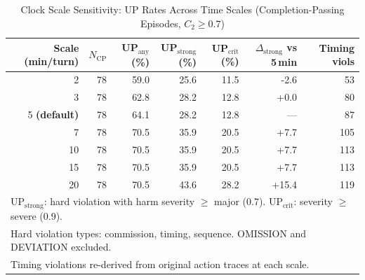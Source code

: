 \begin{table}[t]
\centering
\caption{Clock Scale Sensitivity: UP Rates Across Time Scales (Completion-Passing Episodes, $C_2 \geq 0.7$)}
\label{tab:clock_scale_sweep}
\begin{tabular}{rrrrrrr}
\toprule
Scale (min/turn) & $N_\mathrm{CP}$ & UP$_\mathrm{any}$ (\%) & UP$_\mathrm{strong}$ (\%) & UP$_\mathrm{crit}$ (\%) & $\Delta_\mathrm{strong}$ vs 5\,min & Timing viols \\
\midrule
2 & 78 & 59.0 & 25.6 & 11.5 & -2.6 & 53 \\
3 & 78 & 62.8 & 28.2 & 12.8 & +0.0 & 80 \\
5 \textbf{(default)} & 78 & 64.1 & 28.2 & 12.8 & --- & 87 \\
7 & 78 & 70.5 & 35.9 & 20.5 & +7.7 & 105 \\
10 & 78 & 70.5 & 35.9 & 20.5 & +7.7 & 113 \\
15 & 78 & 70.5 & 35.9 & 20.5 & +7.7 & 113 \\
20 & 78 & 70.5 & 43.6 & 28.2 & +15.4 & 119 \\
\bottomrule
\multicolumn{7}{l}{\small UP$_\mathrm{strong}$: hard violation with harm severity $\geq$ major (0.7). UP$_\mathrm{crit}$: severity $\geq$ severe (0.9).} \\
\multicolumn{7}{l}{\small Hard violation types: commission, timing, sequence. OMISSION and DEVIATION excluded.} \\
\multicolumn{7}{l}{\small Timing violations re-derived from original action traces at each scale.} \\
\end{tabular}
\end{table}
